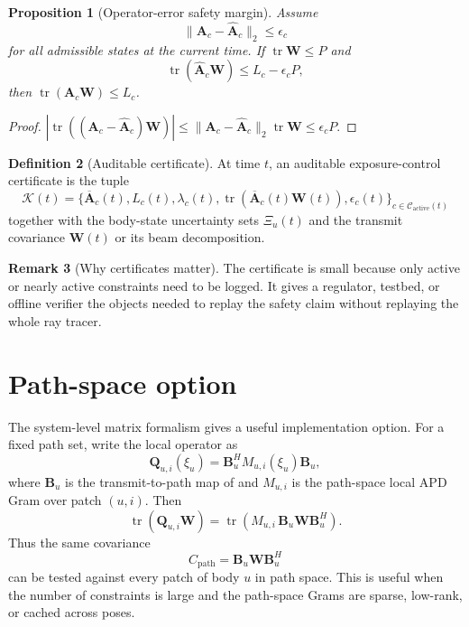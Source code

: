 \documentclass[11pt,a4paper]{article}
\theoremstyle{definition}
\newtheorem{definition}{Definition}[section]
\newtheorem{remark}[definition]{Remark}
\theoremstyle{plain}
\newtheorem{proposition}[definition]{Proposition}
\newcommand{\W}{\mathbf W}
\newcommand{\B}{\mathbf B}
\newcommand{\Q}{\mathbf Q}
\newcommand{\A}{\mathbf A}
\newcommand{\Abar}{\overline{\mathbf A}}
\newcommand{\Constraints}{\mathcal C}
\newcommand{\tr}{\operatorname{tr}}
\begin{document}
\begin{proposition}[Operator-error safety margin]\label{prop:error-margin}
Assume
\begin{equation}
  \|\A_c-\widehat{\A}_c\|_2\le\epsilon_c
\end{equation}
for all admissible states at the current time.  If $\tr\W\le P$ and
\begin{equation}
  \tr(\widehat{\A}_c\W)\le L_c-\epsilon_cP,
\end{equation}
then $\tr(\A_c\W)\le L_c$.
\end{proposition}

\begin{proof}
$|\tr((\A_c-\widehat{\A}_c)\W)|
\le\|\A_c-\widehat{\A}_c\|_2\tr\W\le\epsilon_cP$.
\end{proof}

\begin{definition}[Auditable certificate]
At time $t$, an auditable exposure-control certificate is the tuple
\begin{equation}
  \mathcal K(t)=
  \bigl\{\Abar_c(t),L_c(t),\lambda_c(t),
  \tr(\Abar_c(t)\W(t)),\epsilon_c(t)\bigr\}_{c\in\Constraints_{\mathrm{active}}(t)}
\end{equation}
together with the body-state uncertainty sets $\Xi_u(t)$ and the transmit
covariance $\W(t)$ or its beam decomposition.
\end{definition}

\begin{remark}[Why certificates matter]
The certificate is small because only active or nearly active constraints
need to be logged.  It gives a regulator, testbed, or offline verifier the
objects needed to replay the safety claim without replaying the whole ray
tracer.
\end{remark}

\section{Path-space option}

The system-level matrix formalism gives a useful implementation option.
For a fixed path set, write the local operator as
\begin{equation}\label{eq:path-option}
  \Q_{u,i}(\xi_u)=\B_u^H M_{u,i}(\xi_u)\B_u,
\end{equation}
where $\B_u$ is the transmit-to-path map of  and
$M_{u,i}$ is the path-space local APD Gram over patch $(u,i)$.  Then
\begin{equation}
  \tr(\Q_{u,i}\W)
  =\tr(M_{u,i}\,\B_u\W \B_u^H).
\end{equation}
Thus the same covariance
\begin{equation}
  C_{\mathrm{path}}=\B_u\W \B_u^H
\end{equation}
can be tested against every patch of body $u$ in path space.  This is
useful when the number of constraints is large and the path-space Grams
are sparse, low-rank, or cached across poses.
\end{document}
